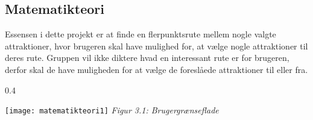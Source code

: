 \subsection{Matematikteori}
Essensen i dette projekt er at finde en flerpunktsrute mellem nogle valgte attraktioner, hvor brugeren skal have mulighed for, at vælge nogle attraktioner til deres rute. Gruppen vil ikke diktere hvad en interessant rute er for brugeren, derfor skal de have muligheden for at vælge de foreslåede attraktioner til eller fra.

\begin{wrapfigure}{}{0.4\textwidth}
  \vspace{-20pt}
  \begin{center}
    \texttt{[image: matematikteori1]} \newline
    \textit{Figur 3.1: Brugergrænseflade}\newline
  \end{center}
  \vspace{-20pt}
\end{wrapfigure}
 
